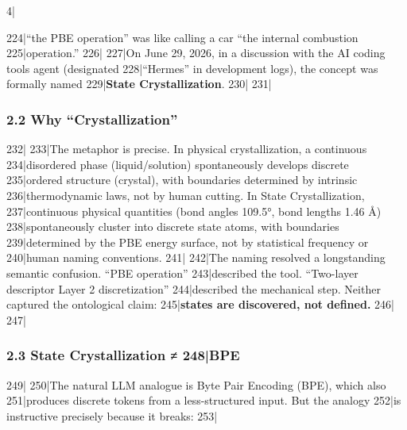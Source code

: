 4|\documentclass[
5|  12pt,
6|]{ctexart}
\begin{document}
224|``the PBE operation'' was like calling a car ``the internal combustion
225|operation.''
226|
227|On June 29, 2026, in a discussion with the AI coding tools agent (designated
228|``Hermes'' in development logs), the concept was formally named
229|\textbf{State Crystallization}.
230|
231|\subsubsection{2.2 Why ``Crystallization''}\label{why-crystallization}
232|
233|The metaphor is precise. In physical crystallization, a continuous
234|disordered phase (liquid/solution) spontaneously develops discrete
235|ordered structure (crystal), with boundaries determined by intrinsic
236|thermodynamic laws, not by human cutting. In State Crystallization,
237|continuous physical quantities (bond angles 109.5°, bond lengths 1.46 Å)
238|spontaneously cluster into discrete state atoms, with boundaries
239|determined by the PBE energy surface, not by statistical frequency or
240|human naming conventions.
241|
242|The naming resolved a longstanding semantic confusion. ``PBE operation''
243|described the tool. ``Two-layer descriptor Layer 2 discretization''
244|described the mechanical step. Neither captured the ontological claim:
245|\textbf{states are discovered, not defined.}
246|
247|\subsubsection{2.3 State Crystallization ≠
248|BPE}\label{state-crystallization-bpe}
249|
250|The natural LLM analogue is Byte Pair Encoding (BPE), which also
251|produces discrete tokens from a less-structured input. But the analogy
252|is instructive precisely because it breaks:
253|
\end{document}
